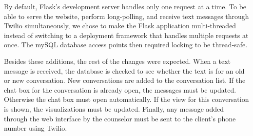 By default, Flask's development server handles only one request at a time. To
be able to serve the website, perform long-polling, and receive text messages through
Twilio simultaneously, we chose to make the Flask application multi-threaded instead
of switching to a deployment framework that handles multiple requests at once. The
mySQL database access points then required locking to be thread-safe.

Besides these additions, the rest of the changes were expected. When a text
message is received, the database is checked to see whether the text is for an old or
new conversation. New conversations are added to the conversation list. If the chat
box for the conversation is already open, the messages must be updated. Otherwise
the chat box must open automatically. If the view for this conversation is shown,
the visualizations must be updated. Finally, any message added through the web
interface by the counselor must be sent to the client's phone number using Twilio.
